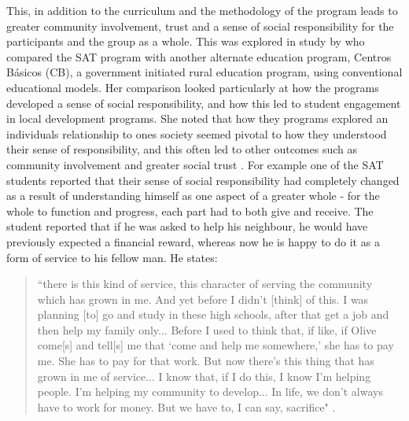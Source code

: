 This, in addition to the curriculum and the methodology of the program leads to greater community involvement, trust and a sense of social responsibility for the participants and the group as a whole.  This was explored in study by \citet{Honeyman2010} who compared the SAT program with another alternate education program, Centros B\'{a}sicos (CB), a government initiated rural education program, using conventional educational models. Her comparison looked particularly at how the programs developed a sense of social responsibility, and how this led to student engagement in local development programs. She noted that how they programs explored an individuals relationship to ones society seemed pivotal to how they understood their sense of responsibility, and this often led to other outcomes such as community involvement and greater social trust \citep{Honeyman2010}. For example one of the SAT students reported that their sense of social responsibility had completely changed as a result of understanding himself as one aspect of a greater whole - for the whole to function and progress, each part had to both give and receive. The student reported that if he was asked to help his neighbour, he would have previously expected a financial reward, whereas now he is happy to do it as a form of service to his fellow man. He states: 
\begin{quote}
“there is this kind of service, this character of serving the community which has grown in me. And yet before I didn’t [think] of this. I was planning [to] go and study in these high schools, after that get a job and then help my family only... Before I used to think that, if like, if Olive come[s] and tell[s] me that `come and help me somewhere,’ she has to pay me. She has to pay for that work. But now there’s this thing that has grown in me of service... I know that, if I do this, I know I’m helping people. I’m helping my community to develop... In life, we don’t always have to work for money. But we have to, I can say, sacrifice" \citep[][p59]{Murphy-Graham2014}.    
\end{quote}




